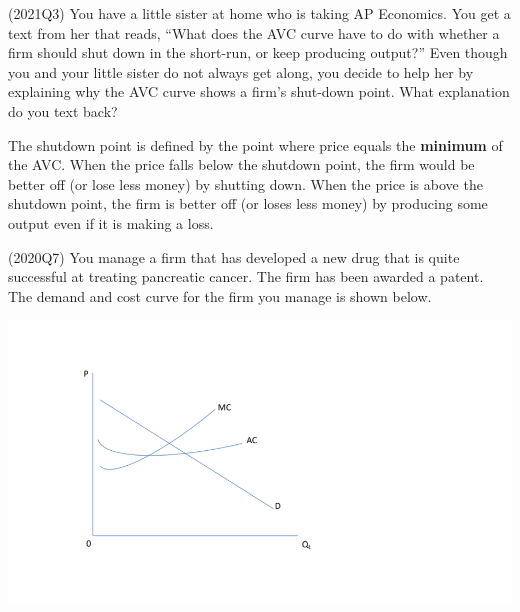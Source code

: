\documentclass{exam}
\begin{document}
\begin{questions}
\question (2021Q3) You have a little sister at home who is taking AP Economics.  You get a text from her that reads, “What does the AVC curve have to do with whether a firm should shut down in the short-run, or keep producing output?”  Even though you and your little sister do not always get along, you decide to help her by explaining why the AVC curve shows a firm’s shut-down point.  What explanation do you text back?
\begin{solution} The shutdown point is defined by the point where price equals the \textbf{minimum} of the AVC. When the price falls below the shutdown point, the firm would be better off (or lose less money) by shutting down. When the price is above the shutdown point, the firm is better off (or loses less money) by producing some output even if it is making a loss.\end{solution}

\pagebreak
\question (2020Q7) You manage a firm that has developed a new drug that is quite successful at treating pancreatic cancer.  The firm has been awarded a patent.  The demand and cost curve for the firm you manage is shown below.

\includegraphics[width = \textwidth]{E2-2021Q7.png}

\end{questions}
\end{document}
